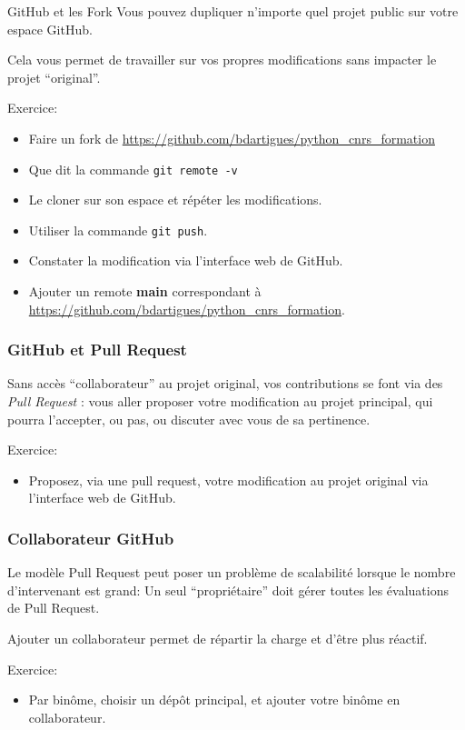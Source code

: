 \documentclass{beamer}
\begin{document}
\begin{frame}{GitHub et les Fork}
  Vous pouvez dupliquer n'importe quel projet public sur votre espace GitHub.
  
  Cela vous permet de travailler sur vos propres modifications sans impacter le projet ``original''.

  Exercice:
  \begin{itemize}
  \item Faire un fork de \url{https://github.com/bdartigues/python_cnrs_formation}
  \item Que dit la commande {\tt git remote -v}
  \item Le cloner sur son espace et répéter les modifications.
  \item Utiliser la commande {\tt git push}.
  \item Constater la modification via l'interface web de GitHub.
  \item Ajouter un remote {\bf main} correspondant à \url{https://github.com/bdartigues/python_cnrs_formation}.
  \end{itemize}
\end{frame}

\begin{frame}\frametitle{GitHub et Pull Request}
  Sans accès ``collaborateur'' au projet original, vos contributions se font via des {\em Pull Request} : vous aller proposer votre modification au projet principal, qui pourra l'accepter, ou pas, ou discuter avec vous de sa pertinence.

  Exercice:
  \begin{itemize}
  \item Proposez, via une pull request, votre modification au projet original via l'interface web de GitHub.
  \end{itemize}
\end{frame}

\begin{frame}\frametitle{Collaborateur GitHub}
  Le modèle Pull Request peut poser un problème de scalabilité lorsque le nombre d'intervenant est grand: Un seul ``propriétaire'' doit gérer toutes les évaluations de Pull Request.
  
  Ajouter un collaborateur permet de répartir la charge et d'être plus réactif.

  Exercice:
  \begin{itemize} 
    \item Par binôme, choisir un dépôt principal, et ajouter votre binôme en collaborateur.
  \end{itemize}
\end{frame}
\end{document}
